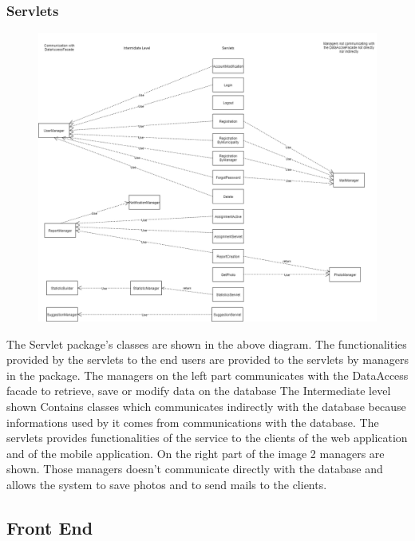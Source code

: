 \subsubsection{Servlets}
\begin{figure}[h]
\centering
\includegraphics[width=\textwidth]{Images/Servlets.png}
\end{figure}
The Servlet package's classes are shown in the above diagram.
The functionalities provided by the servlets to the end users are provided to the servlets by managers in the package. 
The managers  on the left part communicates with the DataAccess facade to retrieve, save or modify data on the database 
The Intermediate level shown Contains classes which communicates indirectly with the database because informations used by it comes from communications with the database. The servlets provides functionalities of the service to the clients of the web application and of the mobile application.
On the right part of the image 2 managers are shown. Those managers doesn't communicate directly with the database and allows the system to save photos and to send mails to the clients.
\clearpage
\subsection{Front End }
